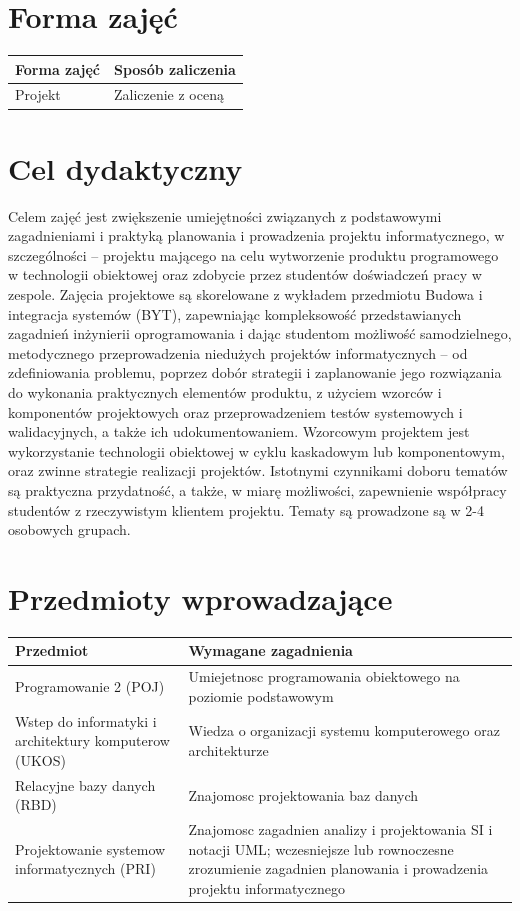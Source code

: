 \documentclass[12pt, a4paper]{article}
\begin{document}
\section{Forma zajęć}

\begin{tabular}{ll}
  \hline
  \textbf{Forma zajęć} & \textbf{Sposób zaliczenia} \\
  \hline
  Projekt & Zaliczenie z oceną \\
  \hline
\end{tabular}

\section{Cel dydaktyczny}

Celem zajęć jest zwiększenie umiejętności związanych z podstawowymi zagadnieniami i praktyką planowania i prowadzenia projektu informatycznego, w szczególności – projektu mającego na celu wytworzenie produktu programowego w technologii obiektowej oraz zdobycie przez studentów doświadczeń pracy w zespole. Zajęcia projektowe są skorelowane z wykładem przedmiotu Budowa i integracja systemów (BYT), zapewniając kompleksowość przedstawianych zagadnień inżynierii oprogramowania i dając studentom możliwość samodzielnego, metodycznego przeprowadzenia niedużych projektów informatycznych – od zdefiniowania problemu, poprzez dobór strategii i zaplanowanie jego rozwiązania do wykonania praktycznych elementów produktu, z użyciem wzorców i komponentów projektowych oraz przeprowadzeniem testów systemowych i walidacyjnych, a także ich udokumentowaniem. Wzorcowym projektem jest wykorzystanie technologii obiektowej w cyklu kaskadowym lub komponentowym, oraz zwinne strategie realizacji projektów. Istotnymi czynnikami doboru tematów są praktyczna przydatność, a także, w miarę możliwości, zapewnienie współpracy studentów z rzeczywistym klientem projektu. Tematy są prowadzone są w 2-4 osobowych grupach.

\section{Przedmioty wprowadzające}

\begin{tabularx}{\textwidth}{lX}
  \hline
  \textbf{Przedmiot} & \textbf{Wymagane zagadnienia} \\
  \hline
  Programowanie 2 (POJ) & Umiejetnosc programowania obiektowego na poziomie podstawowym \\
  Wstep do informatyki i architektury komputerow (UKOS) & Wiedza o organizacji systemu komputerowego oraz architekturze \\
  Relacyjne bazy danych (RBD) & Znajomosc projektowania baz danych \\
  Projektowanie systemow informatycznych (PRI) & Znajomosc zagadnien analizy i projektowania SI i notacji UML; wczesniejsze lub rownoczesne zrozumienie zagadnien planowania i prowadzenia projektu informatycznego \\
  \hline
\end{tabularx}
\end{document}
